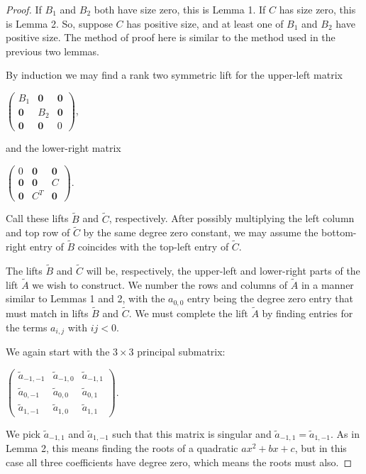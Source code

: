 \documentclass{article}
\begin{document}
\begin{proof}
  If $B_{1}$ and $B_{2}$ both have size zero, this is Lemma 1. If $C$ has size zero, this is Lemma 2. So, suppose $C$ has positive size, and at least one of $B_{1}$ and $B_{2}$ have positive size. The method of proof here is similar to the method used in the previous two lemmas. 
  
  By induction we may find a rank two symmetric lift for the upper-left matrix      
  \begin{center}  
    $\left(\begin{array}{ccc} B_{1} & \textbf{0} & \textbf{0} \\ \textbf{0} & B_{2} & \textbf{0} \\ \textbf{0} & \textbf{0} & 0 \end{array}\right)$,
  \end{center}
  and the lower-right matrix
  \begin{center}
      $\left(\begin{array}{ccc} 0 & \textbf{0} & \textbf{0} \\ \textbf{0} & \textbf{0} & C \\ \textbf{0} & C^{T} & \textbf{0} \end{array}\right)$.
  \end{center}
  Call these lifts $\tilde{B}$ and $\tilde{C}$, respectively. After possibly multiplying the left column and top row of $\tilde{C}$ by the same degree zero constant, we may assume the bottom-right entry of $\tilde{B}$ coincides with the top-left entry of $\tilde{C}$.
  
  The lifts $\tilde{B}$ and $\tilde{C}$ will be, respectively, the upper-left and lower-right parts of the lift $\tilde{A}$ we wish to construct. We number the rows and columns of $\tilde{A}$ in a manner similar to Lemmas 1 and 2, with the $a_{0,0}$ entry being the degree zero entry that must match in lifts $\tilde{B}$ and $\tilde{C}$. We must complete the lift $\tilde{A}$ by finding entries for the terms $a_{i,j}$ with $ij < 0$.
  
  We again start with the $3 \times 3$ principal submatrix:  
  \begin{center}
    $\left(\begin{array}{ccc} \tilde{a}_{-1,-1} & \tilde{a}_{-1,0} & \tilde{a}_{-1,1} \\ \tilde{a}_{0,-1} & \tilde{a}_{0,0} & \tilde{a}_{0,1} \\ \tilde{a}_{1,-1} & \tilde{a}_{1,0} & \tilde{a}_{1,1} \end{array}\right)$.
  \end{center}  
  We pick $\tilde{a}_{-1,1}$ and $\tilde{a}_{1,-1}$ such that this matrix is singular and $\tilde{a}_{-1,1} = \tilde{a}_{1,-1}$. As in Lemma 2, this means finding the roots of a quadratic $ax^{2}+bx+c$, but in this case all three coefficients have degree zero, which means the roots must also.
  

\end{proof}
\end{document}

